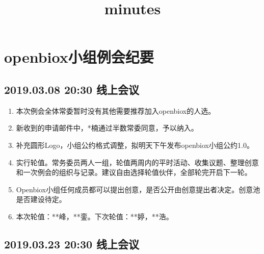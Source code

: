 \documentclass[]{article}
\title{minutes}
\author{}
\date{}
\providecommand{\tightlist}{%
  \setlength{\itemsep}{0pt}\setlength{\parskip}{0pt}}
\begin{document}
\maketitle

\section{openbiox小组例会纪要}\label{openbiox}

\subsection{2019.03.08 20:30 线上会议}

\begin{enumerate}
\def\labelenumi{\arabic{enumi}.}
\tightlist
\item
  本次例会全体常委暂时没有其他需要推荐加入openbiox的人选。
\item
  新收到的申请邮件中，*楠通过半数常委同意，予以纳入。
\item
  补充圆形Logo，小组公约格式调整，拟明天下午发布openbiox小组公约1.0。
\item
  实行轮值。常务委员两人一组，轮值两周内的平时活动、收集议题、整理创意和一次例会的组织与记录。建议自由选择轮值伙伴，全部轮完开启下一轮。
\item
  Openbiox小组任何成员都可以提出创意，是否公开由创意提出者决定。创意池是否建设待定。
\item
  本次轮值：**峰，**銮。下次轮值：**婷，**浩。
\end{enumerate}

\subsection{2019.03.23 20:30 线上会议}\label{-1}
\end{document}
